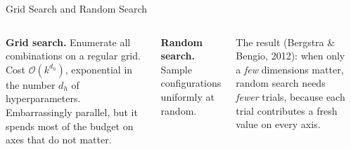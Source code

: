 \documentclass[aspectratio=169,11pt]{beamer}
\newcommand{\emphc}[1]{\textcolor{harvardcrimson}{#1}}
\begin{document}
\begin{frame}{Grid Search and Random Search}
\begin{columns}[T]
\textbf{Grid search.} Enumerate all combinations on a regular grid. Cost $\mathcal{O}(k^{d_h})$, exponential in the number $d_h$ of hyperparameters. Embarrassingly parallel, but it spends most of the budget on axes that do not matter.

\vspace{0.3cm}
\textbf{Random search.} Sample configurations uniformly at random.

\vspace{0.15cm}
\emphc{The result} (Bergstra \& Bengio, 2012): when only a \emph{few} dimensions matter, random search needs \emph{fewer} trials, because each trial contributes a fresh value on every axis.

\begin{center}
\end{center}
\end{columns}
\end{frame}
\end{document}
